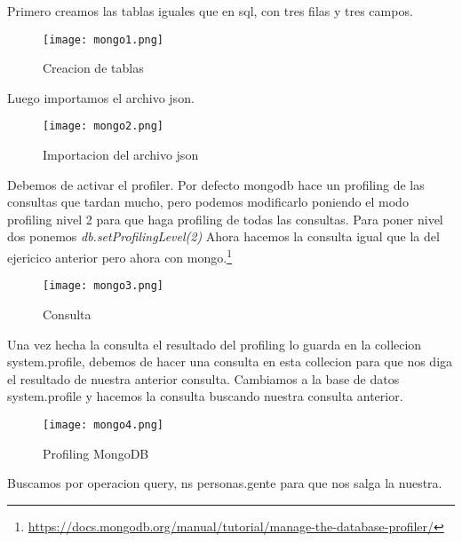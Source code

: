 Primero creamos las tablas iguales que en sql, con tres filas y tres campos.
\begin{figure}[H] 
\centering
\texttt{[image: mongo1.png]}  
\label{figura24:}
\caption{Creacion de tablas}
\end{figure}
Luego importamos el archivo json.
\begin{figure}[H] 
\centering
\texttt{[image: mongo2.png]}  
\label{figura24:}
\caption{Importacion del archivo json}
\end{figure}
Debemos de activar el profiler. Por defecto mongodb hace un profiling de las consultas que tardan mucho, pero podemos modificarlo poniendo el modo profiling nivel 2 para que haga profiling de todas las consultas. Para poner nivel dos ponemos \textit{db.setProfilingLevel(2)} Ahora hacemos la consulta igual que la del ejericico anterior pero ahora con mongo.\footnote{\url{https://docs.mongodb.org/manual/tutorial/manage-the-database-profiler/}}
\begin{figure}[H] 
\centering
\texttt{[image: mongo3.png]}  
\label{figura24:}
\caption{Consulta}
\end{figure}
Una vez hecha la consulta el resultado del profiling lo guarda en la collecion system.profile, debemos de hacer una consulta en esta collecion para que nos diga el resultado de nuestra anterior consulta. Cambiamos a la base de datos system.profile y hacemos la consulta buscando nuestra consulta anterior.
\begin{figure}[H] 
\centering
\texttt{[image: mongo4.png]}  
\label{figura24:}
\caption{Profiling MongoDB}
\end{figure}
Buscamos por operacion query, ns personas.gente para que nos salga la nuestra.


